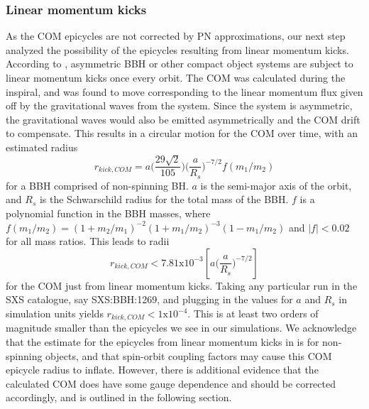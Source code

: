 \documentclass{article}
\begin{document}
\subsubsection{Linear momentum kicks}
As the COM epicycles are not corrected by PN approximations, our next step analyzed the possibility of the epicycles resulting from linear momentum kicks. According to \cite{MF83}, asymmetric BBH or other compact object systems are subject to linear momentum kicks once every orbit. The COM was calculated during the inspiral, and was found to move corresponding to the linear momentum flux given off by the gravitational waves from the system. Since the system is asymmetric, the gravitational waves would also be emitted asymmetrically and the COM drift to compensate. This results in a circular motion for the COM over time, with an estimated radius
\begin{equation}
r_{kick,COM} = a\Big(\frac{29\sqrt{2}}{105}\Big)\Big(\frac{a}{R_s}\Big)^{-7/2} f(m_1/m_2)
\end{equation}
for a BBH comprised of non-spinning BH. $a$ is the semi-major axis of the orbit, and $R_s$ is the Schwarschild radius for the total mass of the BBH. $f$ is a polynomial function in the BBH masses, where $f(m_1/m_2) = (1+m_2/m_1)^{-2}(1+m_1/m_2)^{-3}(1-m_1/m_2)$ and $|f| < 0.02$ for all mass ratios. This leads to radii 
\begin{equation}
r_{kick,COM} < 7.81 \textrm{x} 10^{-3} [a\Big(\frac{a}{R_s}\Big)^{-7/2}]
\end{equation}
for the COM just from linear momentum kicks. Taking any particular run in the SXS catalogue, say SXS:BBH:1269, and plugging in the values for $a$ and $R_s$ in simulation units yields $r_{kick, COM} < 1\textrm{x}10^{-4}$. This is at least two orders of magnitude smaller than the epicycles we see in our simulations.
We acknowledge that the estimate for the epicycles from linear momentum kicks in \cite{MF83} is for non-spinning objects, and that spin-orbit coupling factors may cause this COM epicycle radius to inflate. However, there is additional evidence that the calculated COM does have some gauge dependence and should be corrected accordingly, and is outlined in the following section.
\end{document}
